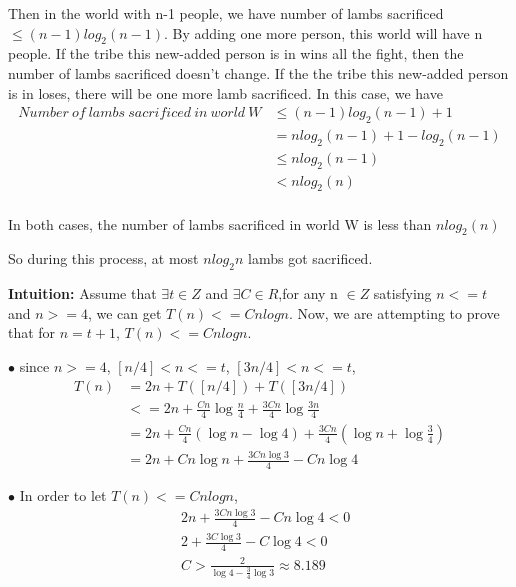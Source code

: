 \documentclass[12pt,a4paper]{article}
\newcommand{\question}[1]{\bigskip\noindent{\textbf{Q{#1} solution}}}
\begin{document}
Then in the world with n-1 people, we have number of lambs sacrificed $\le (n-1)log_2(n-1)$. By adding one more person, this world will have n people. If the tribe this new-added person is in wins all the fight, then the number of lambs sacrificed doesn't change. If the the tribe this new-added person is in loses, there will be one more lamb sacrificed. In this case, we have
\begin{equation*}
    \begin{split}
        Number\ of\ lambs\ sacrificed\ in\ world\ W & \le (n-1)log_2(n-1) + 1 \\
             & = nlog_2(n-1) + 1 - log_2(n-1) \\
             & \le nlog_2(n-1) \\
             & < nlog_2(n) \\
    \end{split}
\end{equation*}

In both cases, the number of lambs sacrificed in world W is less than $nlog_2(n)$

So during this process, at most $nlog_2n$ lambs got sacrificed.

\question{3.A}

\noindent %
	\textbf{Intuition:}
	{Assume that $\exists t \in Z$ and $\exists C \in R$,for any n $\in Z$ satisfying $n<=t$ and $n>=4$, we can get $T(n)<=Cnlogn$. Now, we are attempting to prove that for $n=t+1$, $T(n)<=Cnlogn$.}%

		$\bullet$ since $n>=4$, $[n/4]<n<=t$, $[3n/4]<n<=t$,
		\begin{align*}
 		T(n)&=2n+T([n/4])+T([3n/4]) \\
		&<=2n + \frac{Cn}{4} \log{\frac{n}{4}} + \frac{3Cn}{4} \log{ \frac{3n}{4}}\\
		&= 2n + \frac{Cn}{4}(\log{n}-\log{4}) + \frac{3Cn}{4} ({ \log{n}+\log{\frac{3}{4}}})\\
		&= 2n + Cn\log{n} + \frac{3Cn\log{3}}{4} - Cn\log{4}
		\end{align*}
		
		$\bullet$ In order to let $T(n)<=Cnlogn$,
		\begin{align*}
 		&2n + \frac{3Cn\log{3}}{4} - Cn\log{4} <0 \\
		&2 + \frac{3C\log{3}}{4} - C\log{4} <0 \\
		&C > \frac{2}{\log{4}-\frac{3}{4}\log{3}}\approx 8.189
		\end{align*}
		
\end{document}
